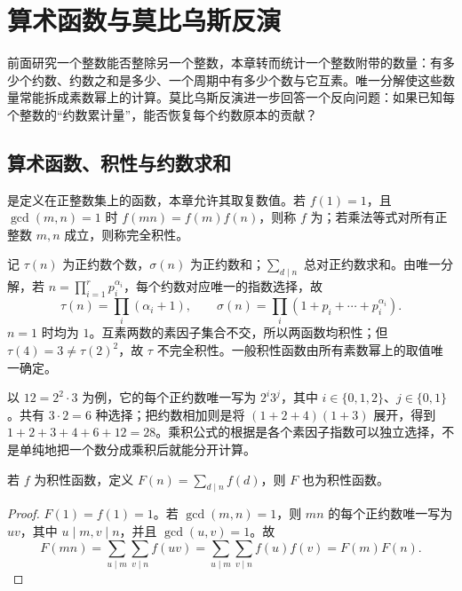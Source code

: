 \documentclass[UTF8,12pt,a4paper,fontset=fandol]{ctexbook}
\begin{document}
\chapter{算术函数与莫比乌斯反演}
\label{ch:arithmetic-functions}

前面研究一个整数能否整除另一个整数，本章转而统计一个整数附带的数量：有多少个约数、约数之和是多少、一个周期中有多少个数与它互素。唯一分解使这些数量常能拆成素数幂上的计算。莫比乌斯反演进一步回答一个反向问题：如果已知每个整数的“约数累计量”，能否恢复每个约数原本的贡献？

\section{算术函数、积性与约数求和}

\begin{definition}
是定义在正整数集上的函数，本章允许其取复数值。若 $f(1)=1$，且 $\gcd(m,n)=1$ 时 $f(mn)=f(m)f(n)$，则称 $f$ 为；若乘法等式对所有正整数 $m,n$ 成立，则称完全积性。
\end{definition}

记 $\tau(n)$ 为正约数个数，$\sigma(n)$ 为正约数和；$\sum_{d\mid n}$ 总对正约数求和。由唯一分解，若 $n=\prod_{i=1}^r p_i^{\alpha_i}$，每个约数对应唯一的指数选择，故
\begin{equation}
 \tau(n)=\prod_i(\alpha_i+1),\qquad
 \sigma(n)=\prod_i(1+p_i+\cdots+p_i^{\alpha_i}).
 \label{eq:divisor-functions}
\end{equation}
$n=1$ 时均为 $1$。互素两数的素因子集合不交，所以两函数均积性；但 $\tau(4)=3\ne\tau(2)^2$，故 $\tau$ 不完全积性。一般积性函数由所有素数幂上的取值唯一确定。

以 $12=2^2\cdot3$ 为例，它的每个正约数唯一写为 $2^i3^j$，其中 $i\in\{0,1,2\}$、$j\in\{0,1\}$。共有 $3\cdot2=6$ 种选择；把约数相加则是将 $(1+2+4)(1+3)$ 展开，得到 $1+2+3+4+6+12=28$。乘积公式的根据是各个素因子指数可以独立选择，不是单纯地把一个数分成乘积后就能分开计算。

\begin{proposition}[约数求和保持积性]
\label{prop:divisor-sum-multiplicative}
若 $f$ 为积性函数，定义 $F(n)=\sum_{d\mid n}f(d)$，则 $F$ 也为积性函数。
\end{proposition}
\begin{proof}
$F(1)=f(1)=1$。若 $\gcd(m,n)=1$，则 $mn$ 的每个正约数唯一写为 $uv$，其中 $u\mid m,v\mid n$，并且 $\gcd(u,v)=1$。故
\[
 F(mn)=\sum_{u\mid m}\sum_{v\mid n}f(uv)
 =\sum_{u\mid m}\sum_{v\mid n}f(u)f(v)=F(m)F(n).
\]
\end{proof}
\end{document}

